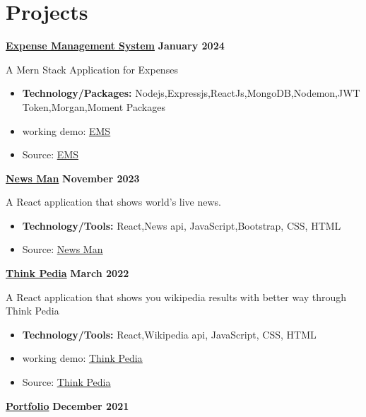 \documentclass[letterpaper, 11pt]{article}
\newcommand{\bulletSpace}{\vspace{-8pt}}
\newcommand{\secStartSpace}{\vspace{3pt}}
\newcommand{\spaceCollapse}{\vspace{-5pt}}
\begin{document}



\section{\color{blue} \textbf{Projects}}
\secStartSpace

\begin{addmargin}[1em]{1em}
\noindent\href{https://github.com/sukhlotey/Expense-Management-System}{\textbf{Expense Management System}}  \hfill \textbf{January 2024} 
		
	\noindent A Mern Stack Application for Expenses
	\spaceCollapse
	\begin{itemize}
		\item \textbf{Technology/Packages:} Nodejs,Expressjs,ReactJs,MongoDB,Nodemon,JWT Token,Morgan,Moment Packages
		      \bulletSpace
        \item working demo:  \href{https://fair-pear-cormorant-cape.cyclic.app/}{\underline{EMS}}
		\item Source:  \href{https://github.com/sukhlotey/Expense-Management-System}{\underline{EMS}}
	\end{itemize}
		
	\noindent\href{https://github.com/sukhlotey/newsdaily}{\textbf{News Man}}  \hfill \textbf{November 2023} 
		
	\noindent A React application that shows world's live news.
	\spaceCollapse
	\begin{itemize}
		\item \textbf{Technology/Tools:} React,News api, JavaScript,Bootstrap, CSS, HTML
		      \bulletSpace
        
		\item Source:  \href{https://github.com/sukhlotey/newsdaily}{\underline{News Man}}
	\end{itemize}
	
	
	\noindent\href{https://github.com/sukhlotey/think-pedia}{\textbf{Think Pedia}}  \hfill \textbf{March 2022} 
		
	\noindent A React application that shows you wikipedia results with better way through Think Pedia
	\spaceCollapse
	\begin{itemize}
		\item \textbf{Technology/Tools:} React,Wikipedia api, JavaScript, CSS, HTML
		      \bulletSpace
		\item working demo:  \href{https://thinkpedia.netlify.app/}{\underline{Think Pedia}}
           \item Source:  \href{https://github.com/sukhlotey/think-pedia}{\underline{Think Pedia}}
	\end{itemize}
	\noindent\href{https://github.com/sukhlotey/imSukhpreet}{\textbf{Portfolio}}  \hfill \textbf{December 2021} 
		

\end{addmargin}
\end{document}
